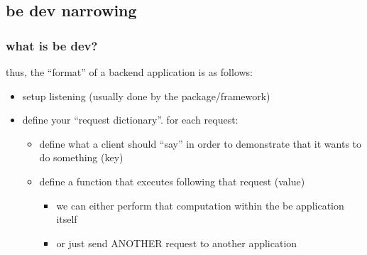 \documentclass{beamer}
\begin{document}


\subsection{be dev narrowing}
\begin{frame}
\frametitle{what is be dev?}
\begin{block}{\textbf{}}
  thus, the ``format'' of a backend application is
  as follows:
  \begin{itemize}
    \item setup listening (usually done by the package/framework)
    \item define your ``request dictionary''. for each request:
          \begin{itemize}
            \item define what a client should ``say'' in order to
                  demonstrate that it wants to do something (key)
            \item define a function that executes following that request (value)
                  \begin{itemize}
                    \item we can either perform that computation within the
                          be application itself
                    \item or just send ANOTHER request to another application
                  \end{itemize}
          \end{itemize}
  \end{itemize}

\end{block}
\end{frame}


\end{document}
